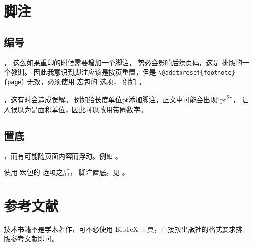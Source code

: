 \section{脚注} %

\subsection{编号}
，
这么如果重印的时候需要增加一个脚注，
势必会影响后续页码，这是 \mybooktitle 排版的一个教训。
因此我意识到脚注应该是按页重置，但是 \verb|\@addtoreset{footnote}{page}|
无效，必须使用  宏包的  选项，
例如 。

，这有时会造成误解。
例如给长度单位pt添加脚注，正文中可能会出现“pt\textsuperscript{2}”，
让人误以为是面积单位，因此可以改用带圈数字。

\subsection{置底}
，而有可能随页面内容而浮动。例如 。

\vspace{1ex}
\centerline{%
\quad{}}

使用  宏包的  选项之后，
脚注置底。见 。 \nopagebreak

\vspace{1ex}
\centerline{%
\quad{}}

\section{参考文献}
技术书籍不是学术著作，可不必使用 BibTeX 工具，直接按出版社的格式要求排版参考文献即可。
